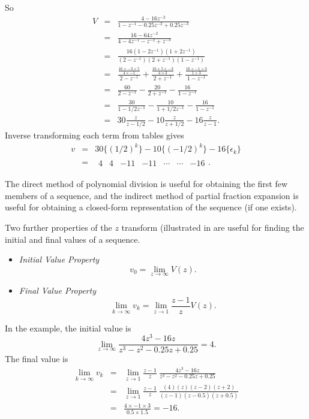 So \begin{eqnarray*}
 V & =&  \frac{4-16z^{-2}}{1-z^{-1}-0.25 z^{-2} +
0.25 z^{-3}}\\ &=& \frac{16-64z^{-2}}{4-4z^{-1}-z^{-2} + z^{-3}}\\
&=&
\frac{16(1-2z^{-1})(1+2z^{-1})}{(2-z^{-1})(2+z^{-1})(1-z^{-1})}\\
&=& \frac{\frac{16\times -3\times 5}{4\times -1}}{2-z^{-1}} +
\frac{\frac{16\times 5\times -3}{4\times 3}}{2+z^{-1}} +
\frac{\frac{16\times -1 \times 3}{1\times 3}}{1-z^{-1}}
\\ &=&\frac{60}{2-z^{-1}} -
\frac{20}{2+z^{-1}} - \frac{16}{1-z^{-1}}
\\&=&\frac{30}{1-{1/2}z^{-1}} -
\frac{10}{1+{1/2}z^{-1}} - \frac{16}{1-z^{-1}}
\\
&=& 30\frac{z}{z-{1/2}} - 10\frac{z}{z+{1/2}} - 16\frac{z}{z-1}.
\end{eqnarray*}
Inverse transforming each term from tables gives
\begin{eqnarray*}v&=&30\{(1/2)^k\}-10\{(-1/2)^k\} -16 \{\epsilon_k\}\\
&=& \begin{array}{ccccccc}
  4 & 4 & -11 & -11 & \cdots & \cdots & -16
\end{array}.
\end{eqnarray*}

The direct method of polynomial division is useful for obtaining
the first few members of a sequence, and the indirect method of
partial fraction expansion is useful for obtaining a closed-form
representation of the sequence (if one exists).

Two further properties of the $z$ transform (illustrated in
 are useful for finding the initial and final
values of a sequence.
\begin{slide}\label{slide:l8s10}
  \begin{itemize}
  \item \emph{Initial Value Property} \[v_0 = \lim_{z\rightarrow
  \infty}V(z).\]
  \item \emph{Final Value Property} \[\lim_{k\rightarrow \infty}v_k = \lim_{z\rightarrow
      1}\frac{z-1}{z}V(z).\]
  \end{itemize}
\end{slide}

In the example, the initial value is \[\lim_{z\rightarrow
  \infty}\frac{4z^3-16z}{z^3-z^2-0.25z+0.25} = 4.\] The final value is
\begin{eqnarray*}
  \lim_{k\rightarrow \infty}v_k &=& \lim_{z\rightarrow
      1}\frac{z-1}{z}\ \frac{4z^3-16z}{z^3-z^2-0.25z+0.25}\\
 &=& \lim_{z\rightarrow
      1}\frac{z-1}{z}\ \frac{(4)(z)(z-2)(z+2)}{(z-1)(z-0.5)(z+0.5)}\\
&=& \frac{4\times -1 \times 3}{0.5\times 1.5} = -16.
\end{eqnarray*}

\endinput

